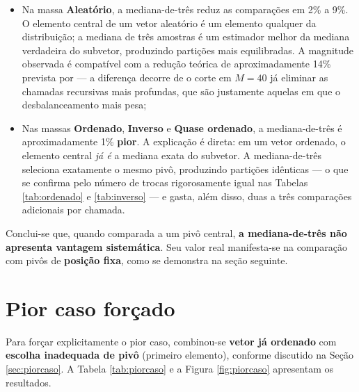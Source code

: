 \begin{itemize}
  \item Na massa \textbf{Aleatório}, a mediana-de-três reduz as comparações em 2\% a
        9\%. O elemento central de um vetor aleatório é um elemento qualquer da
        distribuição; a mediana de três amostras é um estimador melhor da mediana
        verdadeira do subvetor, produzindo partições mais equilibradas. A magnitude
        observada é compatível com a redução teórica de aproximadamente 14\% prevista
        por  --- a diferença decorre de o corte em $M = 40$
        já eliminar as chamadas recursivas mais profundas, que são justamente aquelas
        em que o desbalanceamento mais pesa;

  \item Nas massas \textbf{Ordenado}, \textbf{Inverso} e \textbf{Quase ordenado}, a
        mediana-de-três é aproximadamente 1\% \textbf{pior}. A explicação é direta:
        em um vetor ordenado, o elemento central \textit{já é} a mediana exata do
        subvetor. A mediana-de-três seleciona exatamente o mesmo pivô, produzindo
        partições idênticas --- o que se confirma pelo número de trocas rigorosamente
        igual nas Tabelas \ref{tab:ordenado} e \ref{tab:inverso} --- e gasta, além
        disso, duas a três comparações adicionais por chamada.
\end{itemize}

Conclui-se que, quando comparada a um pivô central, \textbf{a mediana-de-três não
apresenta vantagem sistemática}. Seu valor real manifesta-se na comparação com pivôs
de \textbf{posição fixa}, como se demonstra na seção seguinte.

\section{Pior caso forçado}
\label{sec:res-piorcaso}

Para forçar explicitamente o pior caso, combinou-se \textbf{vetor já ordenado} com
\textbf{escolha inadequada de pivô} (primeiro elemento), conforme discutido na Seção
\ref{sec:piorcaso}. A Tabela \ref{tab:piorcaso} e a Figura \ref{fig:piorcaso}
apresentam os resultados.


